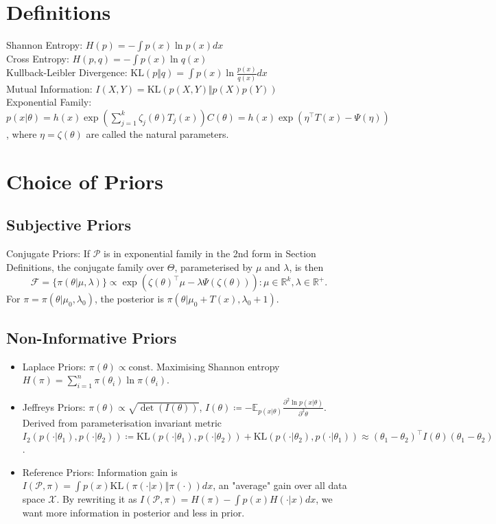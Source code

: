 \documentclass[5pt,a4paper, twocolumn]{article}
\newcommand{\topic}[1]{\section*{#1}}
\newcommand{\subtopic}[1]{\subsection*{#1}}
\begin{document}
{\small
\topic{Definitions}
Shannon Entropy: $H(p) = -\int p(x) \ln p(x) dx$ \\
Cross Entropy: $H(p, q) = -\int p(x) \ln q(x)$ \\
Kullback-Leibler Divergence: $\mathrm{KL}(p \Vert q) = \int p(x) \ln \frac{p(x)}{q(x)}dx$ \\
Mutual Information: $I(X, Y) = \mathrm{KL}(p(X, Y) \Vert p(X)p(Y))$ \\
Exponential Family: $p(x \vert \theta) = h(x) \exp \left( \sum_{j=1}^k \zeta_j(\theta)T_j(x)\right) C(\theta) = h(x)\exp \left(\eta^\top T(x) - \Psi(\eta) \right)$, where $\eta=\zeta(\theta)$ are called the natural parameters.

\topic{Choice of Priors}
\subtopic{Subjective Priors}
Conjugate Priors: If $\mathcal{P}$ is in exponential family in the 2nd form in Section Definitions, the conjugate family over $\Theta$, parameterised by $\mu$ and $\lambda$, is then
\begin{equation*}
\mathcal{F} = \{\pi(\theta \vert \mu, \lambda)\} \propto \exp \left(\zeta(\theta)^\top\mu - \lambda \Psi(\zeta(\theta)) \right) \colon \mu\in\mathbb{R}^k, \lambda \in \mathbb{R}^+.
\end{equation*}
For $\pi = \pi(\theta \vert \mu_0, \lambda_0)$, the posterior is $\pi(\theta \vert \mu_0 + T(x), \lambda_0 + 1)$.

\subtopic{Non-Informative Priors}
\begin{itemize}
    \item Laplace Priors: $\pi(\theta) \propto \text{const}.$ Maximising Shannon entropy $H(\pi) = \sum_{i=1}^n \pi(\theta_i)\ln \pi(\theta_i)$.
    \item Jeffreys Priors: $\pi(\theta) \propto \sqrt{\det (I(\theta))}$, $I(\theta) \coloneqq -\mathbb{E}_{p(x \vert \theta)} \frac{\partial^2 \ln p(x \vert \theta)}{\partial^2 \theta}$. Derived from parameterisation invariant metric $I_2(p(\cdot \vert \theta_1), p(\cdot \vert \theta_2))\coloneqq \mathrm{KL}(p(\cdot \vert \theta_1), p(\cdot \vert \theta_2)) + \mathrm{KL}(p(\cdot \vert \theta_2), p(\cdot \vert \theta_1)) \approx (\theta_1 - \theta_2)^\top I(\theta) (\theta_1 - \theta_2)$.
    \item Reference Priors: Information gain is $I(\mathcal{P}, \pi) = \int p(x) \mathrm{KL}(\pi(\cdot \vert x) \Vert \pi(\cdot)) dx$, an "average" gain over all data space $\mathcal{X}$. By rewriting it as $I(\mathcal{P}, \pi) = H(\pi) - \int p(x) H(\cdot \vert x) dx$, we want more information in posterior and less in prior.
\end{itemize}

}
\end{document}
